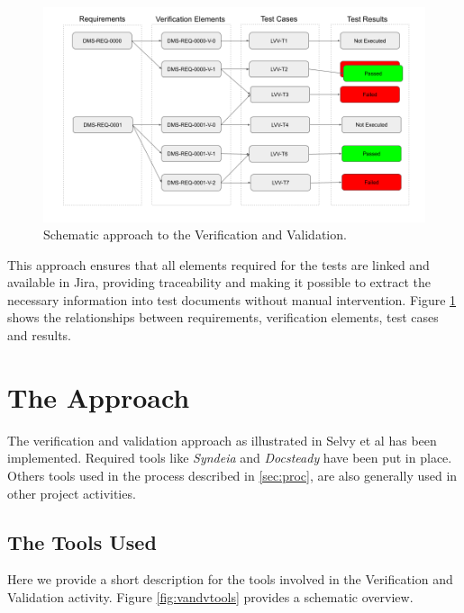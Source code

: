 \begin{figure}
\begin{center}
\includegraphics[width=\textwidth]{imgs/VandVSchema.png}
 \caption{Schematic approach to the Verification and Validation.}
 \label{fig:vandvschema}
\end{center}
\end{figure}

This approach ensures that all elements required for the tests are linked and available in Jira, 
providing traceability and making it possible to extract the necessary information into test documents without manual intervention.
Figure \ref{fig:vandvschema} shows the relationships between requirements, verification elements, test cases and results.


\section{The Approach}

The verification and validation approach as illustrated in  Selvy et al\cite{10.1117/12.2310125}  has been implemented.
Required tools like \textit{Syndeia} and \textit{Docsteady} have been put in place.
Others tools used in the process described in \ref{sec:proc}, are also generally used in other project activities.


\subsection{The Tools Used}

Here we provide a short description for the tools involved in the Verification and Validation activity.
Figure \ref{fig:vandvtools} provides a schematic overview.

